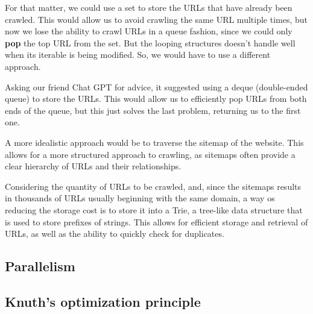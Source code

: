 For that matter, we could use a set to store the URLs that have already been crawled. This would allow us to avoid crawling the same URL multiple times, but now we lose the ability to crawl URLs in a queue fashion, since we could only \textbf{pop} the top URL from the set. But the looping structures doesn't handle well when its iterable is being modified. So, we would have to use a different approach.

Asking our friend Chat GPT for advice, it suggested using a deque (double-ended queue) to store the URLs. This would allow us to efficiently pop URLs from both ends of the queue, but this just solves the last problem, returning us to the first one.

A more idealistic approach would be to traverse the sitemap of the website. This allows for a more structured approach to crawling, as sitemaps often provide a clear hierarchy of URLs and their relationships.

Considering the quantity of URLs to be crawled, and, since the sitemaps results in thousands of URLs usually beginning with the same domain, a way os reducing the storage cost is to store it into a Trie, a tree-like data structure that is used to store prefixes of strings. This allows for efficient storage and retrieval of URLs, as well as the ability to quickly check for duplicates.

\subsection{Parallelism}






\subsection{Knuth's optimization principle}


